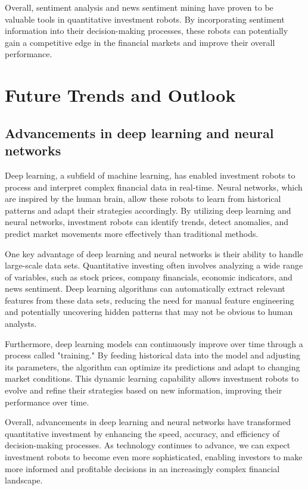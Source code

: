 \documentclass[UTF8]{ctexart}
\begin{document}
Overall, sentiment analysis and news sentiment mining have proven to be valuable tools in quantitative investment robots. By incorporating sentiment information into their decision-making processes, these robots can potentially gain a competitive edge in the financial markets and improve their overall performance.


\section{Future Trends and Outlook}
\subsection{Advancements in deep learning and neural networks}
Deep learning, a subfield of machine learning, has enabled investment robots to process and interpret complex financial data in real-time. Neural networks, which are inspired by the human brain, allow these robots to learn from historical patterns and adapt their strategies accordingly. By utilizing deep learning and neural networks, investment robots can identify trends, detect anomalies, and predict market movements more effectively than traditional methods.

One key advantage of deep learning and neural networks is their ability to handle large-scale data sets. Quantitative investing often involves analyzing a wide range of variables, such as stock prices, company financials, economic indicators, and news sentiment. Deep learning algorithms can automatically extract relevant features from these data sets, reducing the need for manual feature engineering and potentially uncovering hidden patterns that may not be obvious to human analysts.

Furthermore, deep learning models can continuously improve over time through a process called "training." By feeding historical data into the model and adjusting its parameters, the algorithm can optimize its predictions and adapt to changing market conditions. This dynamic learning capability allows investment robots to evolve and refine their strategies based on new information, improving their performance over time.

Overall, advancements in deep learning and neural networks have transformed quantitative investment by enhancing the speed, accuracy, and efficiency of decision-making processes. As technology continues to advance, we can expect investment robots to become even more sophisticated, enabling investors to make more informed and profitable decisions in an increasingly complex financial landscape.
\end{document}
